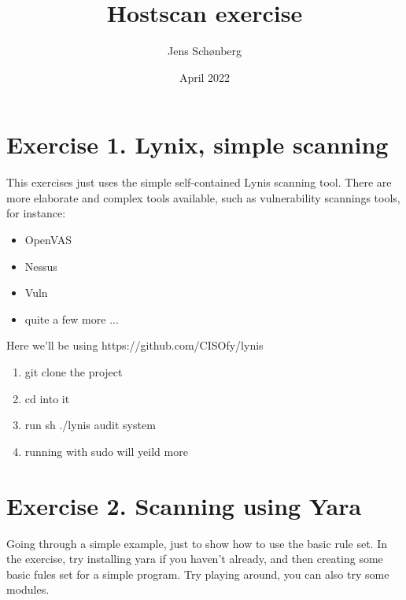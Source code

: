 \documentclass[12pt, letterpaper, twoside]{article}
\title{Hostscan exercise}
\author{Jens Schønberg}
\date{April 2022}
\begin{document}
\begin{titlepage}
\maketitle
\end{titlepage}

\section{Exercise 1. Lynix, simple scanning}
This exercises just uses the simple self-contained Lynis scanning tool.
There are more elaborate and complex tools available, such as vulnerability scannings tools, for instance:
\begin{itemize}
	\item OpenVAS
	\item Nessus
	\item Vuln
	\item quite a few more ...
\end{itemize}
Here we'll be using https://github.com/CISOfy/lynis 

\begin{enumerate}
	\item git clone the project
	\item cd into it
	\item run sh ./lynis audit system
	\item running with sudo will yeild more
\end{enumerate}

\section{Exercise 2. Scanning using Yara}
Going through a simple example, just to show how to use the basic rule set.
In the exercise, try installing yara if you haven't already, and then creating some basic fules set for a simple program.
Try playing around, you can also try some modules.
\end{document}
